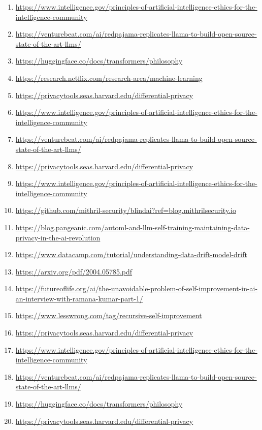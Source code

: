 \documentclass[
]{book}
\begin{document}
\begin{enumerate}
\item
  \url{https://www.intelligence.gov/principles-of-artificial-intelligence-ethics-for-the-intelligence-community}
\item
  \url{https://venturebeat.com/ai/redpajama-replicates-llama-to-build-open-source-state-of-the-art-llms/}
\item
  \url{https://huggingface.co/docs/transformers/philosophy}
\item
  \url{https://research.netflix.com/research-area/machine-learning}
\item
  \url{https://privacytools.seas.harvard.edu/differential-privacy}
\item
  \url{https://www.intelligence.gov/principles-of-artificial-intelligence-ethics-for-the-intelligence-community}
\item
  \url{https://venturebeat.com/ai/redpajama-replicates-llama-to-build-open-source-state-of-the-art-llms/}
\item
  \url{https://privacytools.seas.harvard.edu/differential-privacy}
\item
  \url{https://www.intelligence.gov/principles-of-artificial-intelligence-ethics-for-the-intelligence-community}
\item
  \url{https://github.com/mithril-security/blindai?ref=blog.mithrilsecurity.io}
\item
  \url{https://blog.pangeanic.com/automl-and-llm-self-training-maintaining-data-privacy-in-the-ai-revolution}
\item
  \url{https://www.datacamp.com/tutorial/understanding-data-drift-model-drift}
\item
  \url{https://arxiv.org/pdf/2004.05785.pdf}
\item
  \url{https://futureoflife.org/ai/the-unavoidable-problem-of-self-improvement-in-ai-an-interview-with-ramana-kumar-part-1/}
\item
  \url{https://www.lesswrong.com/tag/recursive-self-improvement}
\item
  \url{https://privacytools.seas.harvard.edu/differential-privacy}
\item
  \url{https://www.intelligence.gov/principles-of-artificial-intelligence-ethics-for-the-intelligence-community}
\item
  \url{https://venturebeat.com/ai/redpajama-replicates-llama-to-build-open-source-state-of-the-art-llms/}
\item
  \url{https://huggingface.co/docs/transformers/philosophy}
\item
  \url{https://privacytools.seas.harvard.edu/differential-privacy}

\end{enumerate}
\end{document}
